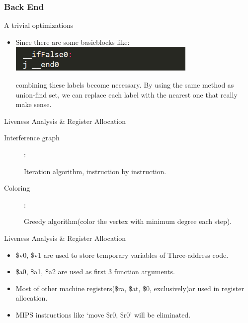 \documentclass{beamer}
\begin{document}
	\begin{frame}
		\frametitle{Back End}
		\begin{block}{A trivial optimizations}
		\begin{itemize}
			\item
			Since there are some basicblocks like:
			\includegraphics[height=0.5in]{label.png}

			combining these labels become necessary. By using the same method as union-find set, we can replace each label with the nearest one that really make sense.
		\end{itemize}
		\end{block}
	\end{frame}

	\begin{frame}
		\begin{block}{Liveness Analysis \& Register Allocation}
		\begin{description}
			\item[Interference graph]: 
			
			Iteration algorithm, instruction by instruction.
			\item[Coloring]: 
			
			Greedy algorithm(color the vertex with minimum degree each step).
		\end{description}
		\end{block}
	\end{frame}

	\begin{frame}
		\begin{block}{Liveness Analysis \& Register Allocation}
		\begin{itemize}
			\item \$v0, \$v1 are used to store temporary variables of Three-address code.
			\item \$a0, \$a1, \$a2 are used as first 3 function arguments.
			\item Most of other machine registers(\$ra, \$at, \$0, exclusively)ar used in register allocation.
			\item MIPS instructions like `move \$r0, \$r0' will be eliminated.
		\end{itemize}
		\end{block}
	\end{frame}
\end{document}
